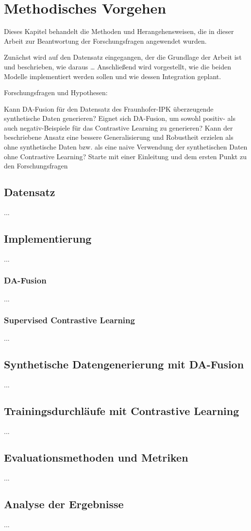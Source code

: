 \chapter{Methodisches Vorgehen}

Dieses Kapitel behandelt die Methoden und Herangehensweisen, die in dieser Arbeit zur Beantwortung der Forschungsfragen angewendet wurden.

Zunächst wird auf den Datensatz eingegangen, der die Grundlage der Arbeit ist und beschrieben, wie daraus … Anschließend wird vorgestellt, wie die beiden Modelle implementiert werden sollen und wie dessen Integration geplant.

Forschungsfragen und Hypothesen:

\textbullet Kann DA-Fusion für den Datensatz des Fraunhofer-IPK überzeugende synthetische Daten generieren?
\textbullet Eignet sich DA-Fusion, um sowohl positiv- als auch negativ-Beispiele für das Contrastive Learning zu generieren?
\textbullet Kann der beschriebene Ansatz eine bessere Generalisierung und Robustheit erzielen als ohne synthetische Daten bzw. als eine naive Verwendung der synthetischen Daten ohne Contrastive Learning?
Starte mit einer Einleitung und dem ersten Punkt zu den Forschungsfragen

\section{Datensatz}

...

\section{Implementierung}

...

\subsection{DA-Fusion}

...

\subsection{Supervised Contrastive Learning}

...

\section{Synthetische Datengenerierung mit DA-Fusion}

...

\section{Trainingsdurchläufe mit Contrastive Learning}

...

\section{Evaluationsmethoden und Metriken}

...

\section{Analyse der Ergebnisse}

...